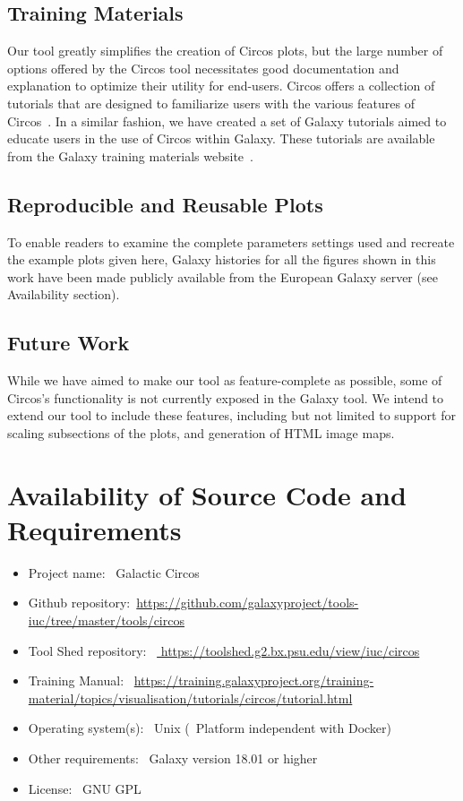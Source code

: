 \subsection*{Training Materials}
Our tool greatly simplifies the creation of Circos plots, but the large number of options offered by the Circos tool necessitates good documentation and explanation to optimize their utility for end-users. Circos offers a collection of tutorials that are designed to familiarize users with the various features of Circos~\cite{circostutorials}. In a similar fashion, we have created a set of Galaxy tutorials aimed to educate users in the use of Circos within Galaxy. These tutorials are available from the Galaxy training materials website~\cite{Batut2018}.

\subsection*{Reproducible and Reusable Plots}
To enable readers to examine the complete parameters settings used and recreate the example plots given here, Galaxy histories for all the figures shown in this work have been made publicly available from the European Galaxy server (see Availability section).

\subsection*{Future Work}
While we have aimed to make our tool as feature-complete as possible, some of Circos's functionality is not currently exposed in the Galaxy tool. We intend to extend our tool to include these features, including but not limited to support for scaling subsections of the plots, and generation of HTML image maps.

\section*{Availability of Source Code and Requirements}
\begin{itemize}
\item Project name: ~Galactic Circos
\item Github repository:~\url{https://github.com/galaxyproject/tools-iuc/tree/master/tools/circos}
\item Tool Shed repository: ~\url{ https://toolshed.g2.bx.psu.edu/view/iuc/circos}
\item Training Manual: ~\url{https://training.galaxyproject.org/training-material/topics/visualisation/tutorials/circos/tutorial.html}
\item Operating system(s): ~Unix (~Platform independent with Docker)
\item Other requirements: ~Galaxy version 18.01 or higher
\item License: ~GNU GPL
\end{itemize}

